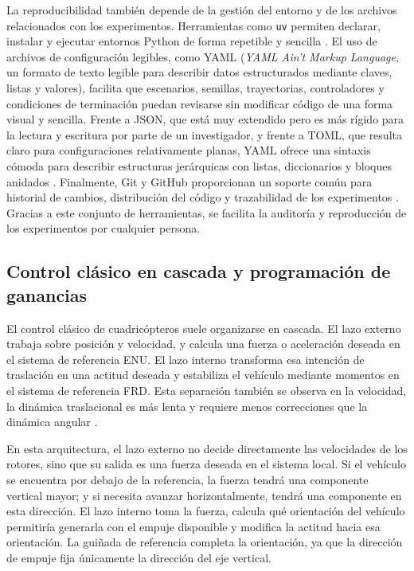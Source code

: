 La reproducibilidad también depende de la gestión del entorno y de los archivos
relacionados con los experimentos. Herramientas como \texttt{uv} permiten declarar, 
instalar y ejecutar entornos Python de forma repetible y sencilla \cite{uvDocs}. 
El uso de archivos de configuración legibles, como YAML (\textit{YAML Ain't Markup Language}, 
un formato de texto legible para describir datos estructurados mediante claves, 
listas y valores), facilita que escenarios, semillas, trayectorias, controladores 
y condiciones de terminación puedan revisarse sin modificar código de una forma 
visual y sencilla. Frente a JSON, que está muy extendido pero es más rígido para la 
lectura y escritura por parte de un investigador, y frente a TOML, que resulta claro para 
configuraciones relativamente planas, YAML ofrece una sintaxis cómoda para 
describir estructuras jerárquicas con listas, diccionarios y bloques anidados 
\cite{yamlSpec,jsonRFC,tomlSpec}. Finalmente, Git y GitHub proporcionan un soporte 
común para historial de cambios, distribución del código y trazabilidad de los experimentos 
\cite{githubDocs}. Gracias a este conjunto de herramientas, se facilita la auditoría y
reproducción de los experimentos por cualquier persona.  

\subsection{Control clásico en cascada y programación de ganancias}

El control clásico de cuadricópteros suele organizarse en cascada. El lazo
externo trabaja sobre posición y velocidad, y calcula una fuerza o aceleración
deseada en el sistema de referencia ENU. El lazo interno transforma
esa intención de traslación en una actitud deseada y estabiliza el vehículo
mediante momentos en el sistema de referencia FRD. Esta separación también se
observa en la velocidad, la dinámica traslacional es más lenta y requiere menos
correcciones que la dinámica angular 
\cite{beard2012small,mellinger2011minimum,lee2010geometric}.

En esta arquitectura, el lazo externo no decide directamente las velocidades de
los rotores, sino que su salida es una fuerza deseada en el sistema local. Si el 
vehículo se encuentra por debajo de la referencia, la fuerza tendrá una componente
vertical mayor; y si necesita avanzar horizontalmente, tendrá una componente en
esta dirección. El lazo interno toma la fuerza, calcula qué orientación del vehículo
permitiría generarla con el empuje disponible y modifica la actitud hacia esa
orientación. La guiñada de referencia completa la orientación, ya que la
dirección de empuje fija únicamente la dirección del eje vertical.


